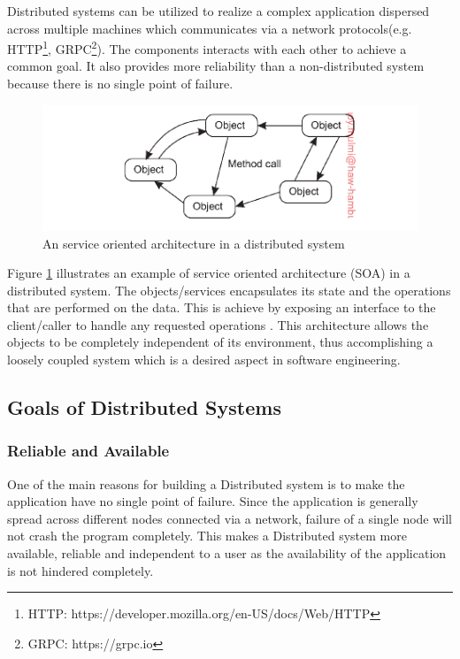     \par
        Distributed systems can be utilized to realize a complex application dispersed across
        multiple machines which communicates via a network protocols(e.g. HTTP\footnote{HTTP: https://developer.mozilla.org/en-US/docs/Web/HTTP}, 
        GRPC\footnote{GRPC: https://grpc.io}). The 
        components interacts with each other to achieve a common goal. It also provides
        more reliability than a non-distributed system because there is no single point
        of failure. 

    \begin{figure}[H]
        \centering \includegraphics[scale=0.9]{grafiken/objectBasedDS.png}
        \caption{An service oriented architecture in a distributed system 
            \cite[p.~62]{DistributedSystems}}
        \label{fig:objectBasedDS}
    \end{figure}

    \par
        Figure \ref{fig:objectBasedDS} illustrates an example of service oriented architecture 
        (SOA) in a distributed system. The objects/services encapsulates its state and 
        the operations that are performed on the data. This is achieve by exposing an 
        interface to the client/caller to handle any requested operations
        \cite{DistributedSystems}. This architecture allows the objects to be
        completely independent of its environment, thus accomplishing a loosely
        coupled system which is a desired aspect in software engineering.
        
    \subsection{Goals of Distributed Systems} 
        \subsubsection{Reliable and Available}
        One of the main reasons for building a Distributed system is to make the application have no single point of failure.
        Since the application is generally spread across different nodes connected via a network, failure of a single node will not 
        crash the program completely. This makes a Distributed system more available, reliable and independent to a user as the availability
        of the application is not hindered completely.
        
